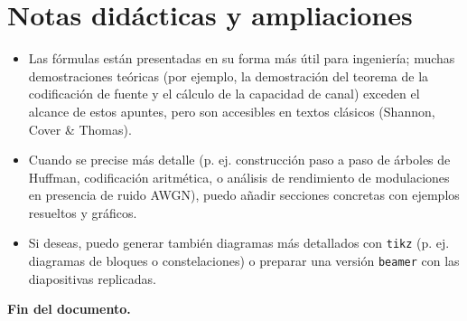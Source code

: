 \documentclass[11pt,a4paper]{article}
\begin{document}
\section{Notas didácticas y ampliaciones}
\begin{itemize}
  \item Las fórmulas están presentadas en su forma más útil para ingeniería; muchas demostraciones teóricas (por ejemplo, la demostración del teorema de la codificación de fuente y el cálculo de la capacidad de canal) exceden el alcance de estos apuntes, pero son accesibles en textos clásicos (Shannon, Cover \& Thomas).
  \item Cuando se precise más detalle (p. ej. construcción paso a paso de árboles de Huffman, codificación aritmética, o análisis de rendimiento de modulaciones en presencia de ruido AWGN), puedo añadir secciones concretas con ejemplos resueltos y gráficos.
  \item Si deseas, puedo generar también diagramas más detallados con \texttt{tikz} (p. ej. diagramas de bloques o constelaciones) o preparar una versión \texttt{beamer} con las diapositivas replicadas.
\end{itemize}

\bigskip
\noindent\textbf{Fin del documento.}
\end{document}
